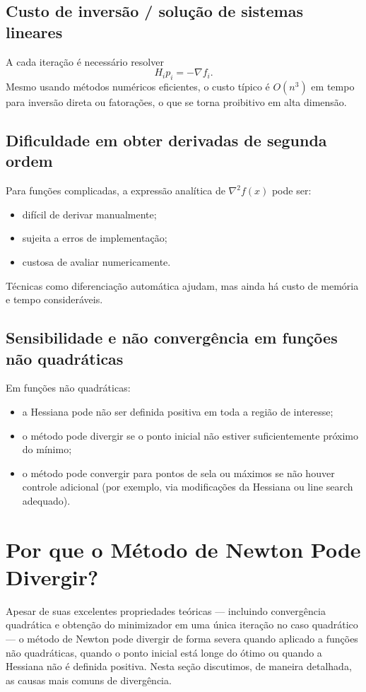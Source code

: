 \documentclass[9pt,a4paper]{extarticle}
\begin{document}
\subsection*{Custo de inversão / solução de sistemas lineares}

A cada iteração é necessário resolver
\[
H_i p_i = - \nabla f_i.
\]
Mesmo usando métodos numéricos eficientes, o custo típico é $O(n^3)$ em tempo
para inversão direta ou fatorações, o que se torna proibitivo em alta dimensão.

\subsection*{Dificuldade em obter derivadas de segunda ordem}

Para funções complicadas, a expressão analítica de $\nabla^2 f(x)$ pode ser:
\begin{itemize}
    \item difícil de derivar manualmente;
    \item sujeita a erros de implementação;
    \item custosa de avaliar numericamente.
\end{itemize}
Técnicas como diferenciação automática ajudam, mas ainda há custo de memória e
tempo consideráveis.

\subsection*{Sensibilidade e não convergência em funções não quadráticas}

Em funções não quadráticas:
\begin{itemize}
    \item a Hessiana pode não ser definida positiva em toda a região de interesse;
    \item o método pode divergir se o ponto inicial não estiver suficientemente
          próximo do mínimo;
    \item o método pode convergir para pontos de sela ou máximos se não houver
          controle adicional (por exemplo, via modificações da Hessiana ou
          line search adequado).
\end{itemize}

\section{Por que o Método de Newton Pode Divergir?}

Apesar de suas excelentes propriedades teóricas --- incluindo convergência quadrática 
e obtenção do minimizador em uma única iteração no caso quadrático --- o método de 
Newton pode divergir de forma severa quando aplicado a funções não quadráticas, 
quando o ponto inicial está longe do ótimo ou quando a Hessiana não é definida 
positiva. Nesta seção discutimos, de maneira detalhada, as causas mais comuns de 
divergência.
\end{document}
